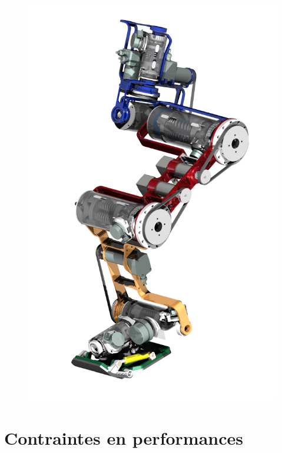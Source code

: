\documentclass[10pt]{beamer}
\begin{document}
\begin{frame}[allowframebreaks]
\begin{figure}[H]
\begin{columns}[T]
\begin{column}{.3\textwidth}
      \includegraphics[width=\textwidth]{figs/jambeFlexibleRaideurVariable}
		\end{column}
	\end{columns}
	\end{figure}
	\framebreak
	
\end{frame}



\section{Contraintes en performances}
\end{document}
